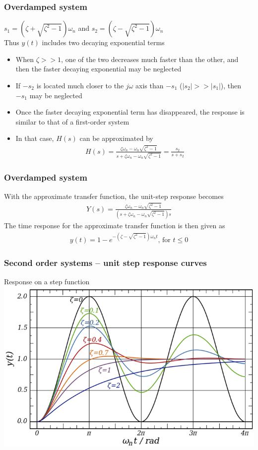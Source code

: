 \begin{frame}
\frametitle{Overdamped system}
$s_1 = (\zeta +\sqrt{\zeta^2 -1})\omega_n$ and $s_2 = (\zeta -\sqrt{\zeta^2 -1})\omega_n$
\vspace{0.3cm}
\\ Thus $y(t)$ includes two decaying exponential terms
\begin{itemize}
\vspace{0.2cm}
\item When $\zeta >> 1$, one of the two decreases much faster than the other, and then the faster decaying exponential may be neglected
\vspace{0.2cm}
\item If $-s_2$ is located much closer to the $j\omega$ axis than $-s_1$ ($|s_2|>>|s_1|$), then $-s_1$ may be neglected
\vspace{0.3cm}
\item Once the faster decaying exponential term has disappeared, the response is similar to that of a first-order system
\vspace{0.3cm}
\item In that case, $H(s)$ can be approximated by 
\begin{align*}
H(s) = \frac{\zeta\omega_n - \omega_n\sqrt{\zeta^2-1}}{s+\zeta\omega_n -\omega_n\sqrt{\zeta^2-1}}=\frac{s_2}{s+s_2}
\end{align*}
\end{itemize}
\end{frame}

\begin{frame}
\frametitle{Overdamped system}
With the approximate transfer function, the unit-step response becomes
\begin{align*}
 Y(s) = \frac{\zeta\omega_n - \omega_n\sqrt{\zeta^2-1}}{(s+\zeta\omega_n -\omega_n\sqrt{\zeta^2-1})s}
\end{align*}
The time response for the approximate transfer function is then given as\\ 
\begin{align*}
y(t)= 1 -e^{-(\zeta-\sqrt{\zeta^2 -1})\omega_n t}\text{, for }t\le 0
\end{align*}
\end{frame}

\begin{frame}
\frametitle{Second order systems – unit step response curves}
Response on a step function
\vspace{1cm} 
\includegraphics[width=0.8\linewidth]{Afbeelding6}
\end{frame}

